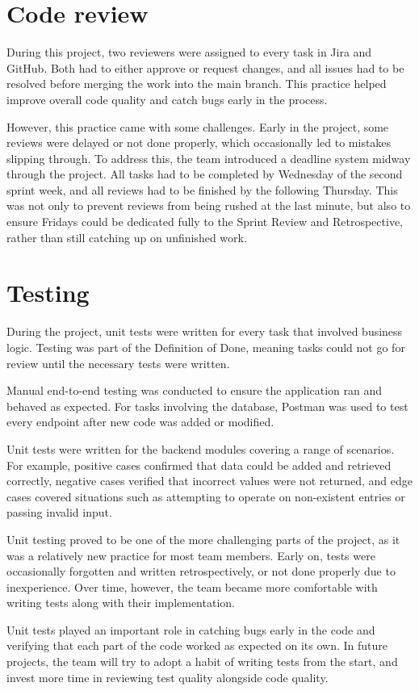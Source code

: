 \section{Code review}
\hspace*{1cm} During this project, two reviewers were assigned to every task in Jira and GitHub. Both had to either approve or request changes, and all issues had to be resolved before merging the work into the main branch. This practice helped improve overall code quality and catch bugs early in the process.

\hspace*{1cm}However, this practice came with some challenges. Early in the project, some reviews were delayed or not done properly, which occasionally led to mistakes slipping through. To address this, the team introduced a deadline system midway through the project. All tasks had to be completed by Wednesday of the second sprint week, and all reviews had to be finished by the following Thursday. This was not only to prevent reviews from being rushed at the last minute, but also to ensure Fridays could be dedicated fully to the Sprint Review and Retrospective, rather than still catching up on unfinished work.

\section{Testing}
\hspace*{1cm} During the project, unit tests were written for every task that involved business logic. Testing was part of the Definition of Done, meaning tasks could not go for review until the necessary tests were written.

\hspace*{1cm}Manual end-to-end testing was conducted to ensure the application ran and behaved as expected. For tasks involving the database, Postman was used to test every endpoint 
after new code was added or modified.

\hspace*{1cm}Unit tests were written for the backend modules covering a range of scenarios. For example, positive cases confirmed that data could be added and retrieved correctly, 
negative cases verified that incorrect values were not returned, and edge cases covered situations such as attempting to operate on non-existent entries or passing invalid 
input.

\hspace*{1cm}Unit testing proved to be one of the more challenging parts of the project, as it was a relatively new practice for most team members. Early on, tests were occasionally 
forgotten and written retrospectively, or not done properly due to inexperience. Over time, however, the team became more comfortable with writing tests along with their 
implementation. 

\hspace*{1cm}Unit tests played an important role in catching bugs early in the code and verifying that each part of the code worked as expected on its own. In future 
projects, the team will try to adopt a habit of writing tests from the start, and invest more time in reviewing test quality alongside code quality.


